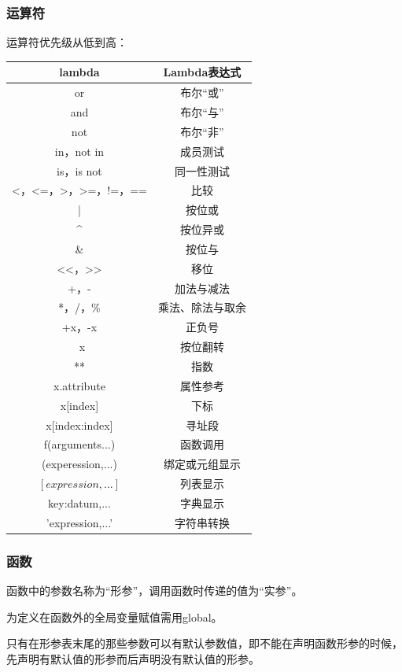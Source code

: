 \documentclass[5pt,a4paper,twocolumn]{article}
\begin{document}
\subsubsection*{运算符}
运算符优先级从低到高：
\begin{table}[!hbp]
\begin{tabular}{ c c }
lambda & Lambda表达式\\
\hline
or & 布尔“或”\\
\hline
and & 布尔“与”\\
\hline
not & 布尔“非”\\
\hline
in，not in & 成员测试\\
\hline
is，is not & 同一性测试\\
\hline
<，<=，>，>=，!=，== & 比较\\
\hline
| & 按位或\\
\hline
\^{} & 按位异或\\
\hline
\& & 按位与\\
\hline
<<，>> & 移位\\
\hline
+，- & 加法与减法\\
\hline
*，/，\% & 乘法、除法与取余\\
\hline
+x，-x & 正负号\\
\hline
~x & 按位翻转\\
\hline
** & 指数\\
\hline
x.attribute & 属性参考\\
\hline
x[index] & 下标\\
\hline
x[index:index] & 寻址段\\
\hline
f(arguments...) & 函数调用\\
\hline
(experession,...) & 绑定或元组显示\\
\hline
$[expression,...]$ & 列表显示\\
\hline
{key:datum,...} & 字典显示\\
\hline
'expression,...' & 字符串转换\\
\hline
\end{tabular}
\end{table}

\subsubsection*{函数}
函数中的参数名称为“形参”，调用函数时传递的值为“实参”。

为定义在函数外的全局变量赋值需用global。

只有在形参表末尾的那些参数可以有默认参数值，即不能在声明函数形参的时候，先声明有默认值的形参而后声明没有默认值的形参。
\end{document}

